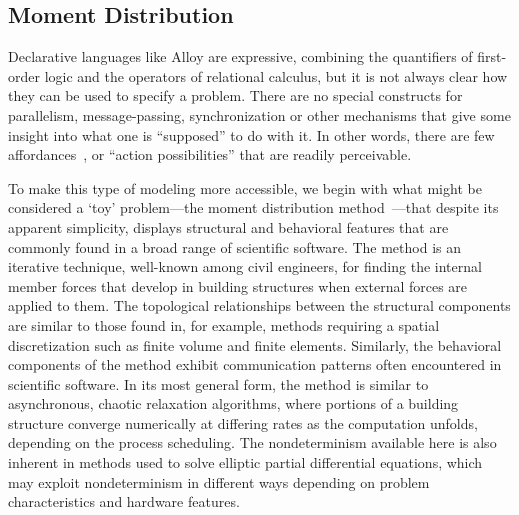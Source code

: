 \documentclass[12pt]{article}
\begin{document}
\subsection{Moment Distribution}

Declarative languages like Alloy are expressive, combining the quantifiers of first-order logic and the operators of relational calculus, but it is not always clear how they can be used to specify a problem.  There are no special constructs for parallelism, message-passing, synchronization or other mechanisms that give some insight into what one is ``supposed'' to do with it.  In other words, there are few affordances~\citep{norman1999}, \label{affordances} or ``action possibilities'' that are readily perceivable.

To make this type of modeling more accessible, we begin with what might be considered a `toy' problem---the moment distribution method~\citep{cross1930}---that despite its apparent simplicity, displays structural and behavioral features that are commonly found in a broad range of scientific software.  The method is an iterative technique, well-known among civil engineers, for finding the internal member forces that develop in building structures when external forces are applied to them.  The topological relationships between the structural components are similar to those found in, for example, methods requiring a spatial discretization such as finite volume and finite elements.  Similarly, the behavioral components of the method exhibit communication patterns often encountered in scientific software.  In its most general form, the method is similar to asynchronous, chaotic relaxation algorithms, where portions of a building structure converge numerically at differing rates as the computation unfolds, depending on the process scheduling.  The nondeterminism available here is also inherent in methods used to solve elliptic partial differential equations, which may exploit nondeterminism in different ways depending on problem characteristics and hardware features. 

\end{document}
